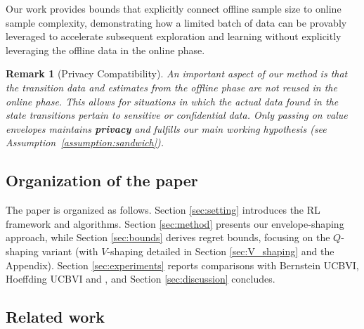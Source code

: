 \documentclass[twoside]{article}
\newtheorem{remark}{Remark}
\begin{document}
Our work provides bounds that explicitly connect offline sample size to online sample complexity, demonstrating how a limited batch of data can be provably leveraged to accelerate subsequent exploration and learning without explicitly leveraging the offline data in the online phase.

\begin{remark}[Privacy Compatibility]
    An important aspect of our method is that the transition data and estimates from the offline phase are not reused in the online phase. This allows for situations in which the actual data found in the state transitions pertain to sensitive or confidential data. Only passing on value envelopes maintains \textbf{privacy} and fulfills our main working hypothesis (see Assumption~\ref{assumption:sandwich}).
\end{remark}

\subsection{Organization of the paper}
The paper is organized as follows. Section \ref{sec:setting} introduces the RL framework and algorithms. Section \ref{sec:method} presents our envelope-shaping approach, while Section \ref{sec:bounds} derives regret bounds, focusing on the $Q$-shaping variant (with $V$-shaping detailed in Section \ref{sec:V_shaping} and the Appendix). Section \ref{sec:experiments} reports comparisons with Bernstein UCBVI, Hoeffding UCBVI and \cite{gupta_unpacking_2022}, and Section \ref{sec:discussion} concludes.

\subsection{Related work}
\end{document}
